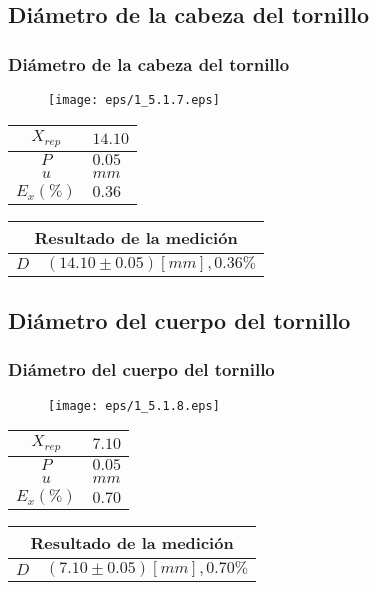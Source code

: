 \documentclass[letter,11pt]{beamer}
\begin{document}
\subsection{Diámetro de la cabeza del tornillo}
\begin{frame}
\frametitle{Diámetro de la cabeza del tornillo}
\vspace*{0.8cm}
\begin{figure}
\centering
\texttt{[image: eps/1\_5.1.7.eps]}
\end{figure}
\vspace*{0.4cm}
\scriptsize
\begin{tabular}{|c|>{\centering}m{1.8cm}<{\centering}|}
\hline
$X_{rep}$ &  $14.10$ \tabularnewline \hline
      $P$ &   $0.05$ \tabularnewline \hline
      $u$ &     $mm$ \tabularnewline \hline
$E_x(\%)$ &   $0.36$ \tabularnewline \hline
\end{tabular}
\quad
\begin{tabular}{|c|>{\centering}m{5.7cm}<{\centering}|}
\hline
\multicolumn{2}{|c|}{\textbf{Resultado de la medición}} \\ \hline
$D$ & $( 14.10\pm0.05)[mm], 0.36\%$ \tabularnewline \hline
\end{tabular}
\end{frame}

\subsection{Diámetro del cuerpo del tornillo}
\begin{frame}
\frametitle{Diámetro del cuerpo del tornillo}
\vspace*{0.8cm}
\begin{figure}
\centering
\texttt{[image: eps/1\_5.1.8.eps]}
\end{figure}
\vspace*{0.4cm}
\scriptsize
\begin{tabular}{|c|>{\centering}m{1.8cm}<{\centering}|}
\hline
$X_{rep}$ &   $7.10$ \tabularnewline \hline
      $P$ &   $0.05$ \tabularnewline \hline
      $u$ &     $mm$ \tabularnewline \hline
$E_x(\%)$ &   $0.70$ \tabularnewline \hline
\end{tabular}
\quad
\begin{tabular}{|c|>{\centering}m{5.7cm}<{\centering}|}
\hline
\multicolumn{2}{|c|}{\textbf{Resultado de la medición}} \\ \hline
$D$ & $(  7.10\pm0.05)[mm], 0.70\%$ \tabularnewline \hline
\end{tabular}
\end{frame}
\end{document}
